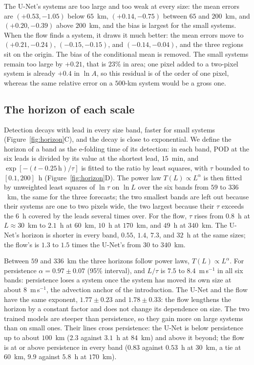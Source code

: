 \documentclass[draft]{agujournal2019}
\begin{document}
The U-Net's systems are too large and too weak at every size: the mean
errors are $(+0.53, -1.05)$ below $65$~km, $(+0.14, -0.75)$ between $65$
and $200$~km, and $(+0.20, -0.39)$ above $200$~km, and the bias is largest
for the small systems. When the flow finds a system, it draws it much
better: the mean errors move to $(+0.21, -0.24)$, $(-0.15, -0.15)$, and
$(-0.14, -0.04)$, and the three regions sit on the origin. The bias of the
conditional mean is removed. The small systems remain too large by
$+0.21$, that is $23\%$ in area; one pixel added to a two-pixel system is
already $+0.4$ in $\ln A$, so this residual is of the order of one pixel,
whereas the same relative error on a $500$-km system would be a gross
one.

\subsection{The horizon of each scale}\label{sec:res-horizon}

Detection decays with lead in every size band, faster for small systems
(Figure~\ref{fig:horizon}C), and the decay is close to exponential. We
define the horizon of a band as the e-folding time of its detection: in
each band, $\mathrm{POD}$ at the six leads is divided by its value at the
shortest lead, $15$~min, and $\exp[-(t - 0.25\,\mathrm{h})/\tau]$ is
fitted to the ratio by least squares, with $\tau$ bounded to
$[0.1, 200]$~h (Figure~\ref{fig:horizon}D). The power law
$T(L) \propto L^{\alpha}$ is then fitted by unweighted least squares of
$\ln\tau$ on $\ln L$ over the six bands from $59$ to $336$~km, the same
for the three forecasts; the two smallest bands are left out because
their systems are one to two pixels wide, the two largest because their
$\tau$ exceeds the $6$~h covered by the leads several times over. For
the flow, $\tau$ rises from $0.8$~h at
$L \approx 30$~km to $2.1$~h at $60$~km, $10$~h at $170$~km, and $49$~h at
$340$~km. The U-Net's horizon is shorter in every band, $0.55$, $1.4$,
$7.3$, and $32$~h at the same sizes; the flow's is $1.3$ to $1.5$ times
the U-Net's from $30$ to $340$~km.

Between $59$ and $336$~km the three horizons follow power laws,
$T(L) \propto L^{\alpha}$. For persistence $\alpha = 0.97 \pm 0.07$ (95\%
interval), and $L/\tau$ is $7.5$ to $8.4$~m\,s$^{-1}$ in all six bands:
persistence loses a system once the system has moved its own size at
about $8$~m\,s$^{-1}$, the advection anchor of the introduction. The U-Net and the flow have the same exponent,
$1.77 \pm 0.23$ and $1.78 \pm 0.33$: the flow lengthens the horizon by a
constant factor and does not change its dependence on size. The two
trained models are steeper than persistence, so they gain more on large
systems than on small ones. Their lines cross persistence: the U-Net is
below persistence up to about $100$~km ($2.3$ against $3.1$~h at $84$~km)
and above it beyond; the flow is at or above persistence in every band
($0.83$ against $0.53$~h at $30$~km, a tie at $60$~km, $9.9$ against
$5.8$~h at $170$~km).
\end{document}
